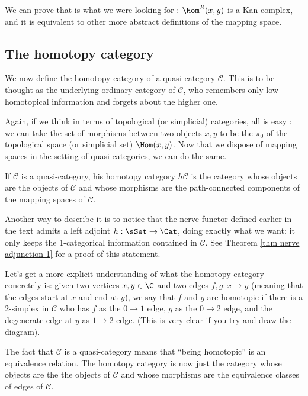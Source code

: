 \begin{refsection}
We can prove that is what we were looking for :  $\Hom^R(x,y)$ is a Kan complex, and it is equivalent to other more abstract definitions of the mapping space.



\subsection{The homotopy category}

We now define the homotopy category of a quasi-category $\mathcal C$. This is to be thought as the underlying ordinary category of $\mathcal C$, who remembers only low homotopical information and forgets about the higher one. 

Again, if we think in terms of topological (or simplicial) categories, all is easy : we can take the set of morphisms between two objects $x,y$ to be the $\pi_0$ of the topological space (or simplicial set) $\Hom (x,y)$. Now that we dispose of mapping spaces in the setting of quasi-categories, we can do the same.

\begin{defin}
If $\mathcal C$ is a  quasi-category, his homotopy category $h\mathcal C$ is the category whose objects are the objects of $\mathcal C$ and whose morphisms are the path-connected components of the mapping spaces of $\mathcal C$.
\end{defin}

Another way to describe it is to notice that the nerve functor defined earlier in the text admits a left adjoint $h: \sSet \to \Cat$, doing exactly what we want: it only keeps the 1-categorical information contained in $\mathcal C$. See Theorem \ref{thm nerve adjunction 1} for a proof of this statement.

Let's get a more explicit understanding of what the homotopy category concretely is: given two vertices $x,y \in \C$ and two edges $f,g : x \to y$ (meaning that the edges start at $x$ and end at $y$), we say that $f$ and $g$ are homotopic if there is a $2$-simplex in $\mathcal C$ who has $f$ as the $0\to 1$ edge, $g$ as the $0\to 2$ edge, and the degenerate edge at $y$ as $1 \to 2$ edge. (This is very clear if you try and draw the diagram).

The fact that $\mathcal C$ is a quasi-category means that ``being homotopic'' is an equivalence relation. The homotopy category is now just the category whose objects are the the objects of $\mathcal C$ and whose morphisms are the equivalence classes of edges of $\mathcal C$.




\end{refsection}
